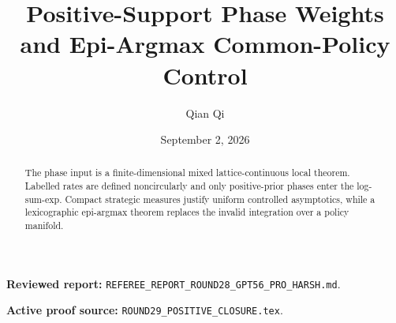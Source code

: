 \documentclass[11pt,reqno]{amsart}
\title[D1 Round 29 revision]{Positive-Support Phase Weights and Epi-Argmax Common-Policy Control}
\author{Qian Qi}
\date{September 2, 2026}
\begin{document}
\begin{abstract}The phase input is a finite-dimensional mixed lattice-continuous local theorem. Labelled rates are defined noncircularly and only positive-prior phases enter the log-sum-exp. Compact strategic measures justify uniform controlled asymptotics, while a lexicographic epi-argmax theorem replaces the invalid integration over a policy manifold.\end{abstract}
\maketitle
\noindent\textbf{Reviewed report:} \texttt{REFEREE\_REPORT\_ROUND28\_GPT56\_PRO\_HARSH.md}.\par
\noindent\textbf{Active proof source:} \texttt{ROUND29\_POSITIVE\_CLOSURE.tex}.\par

\end{document}
